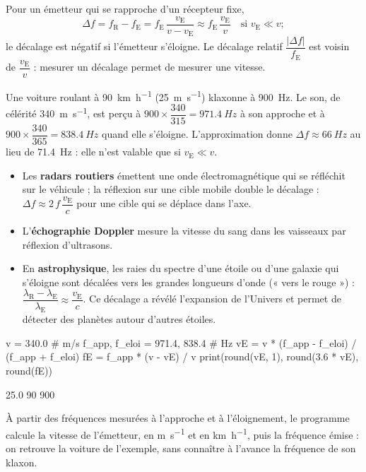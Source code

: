 \begin{loi}
Pour un émetteur qui se rapproche d'un récepteur fixe,
\[\Delta f=f_\mathrm{R}-f_\mathrm{E}=f_\mathrm{E}\,\frac{v_\mathrm{E}}{v-v_\mathrm{E}}\approx f_\mathrm{E}\,\frac{v_\mathrm{E}}{v}\quad\text{si }v_\mathrm{E}\ll v ;\]
le décalage est négatif si l'émetteur s'éloigne. Le décalage relatif $\dfrac{|\Delta f|}{f_\mathrm{E}}$ est voisin de $\dfrac{v_\mathrm{E}}{v}$ :
mesurer un décalage permet de mesurer une vitesse.
\end{loi}
\begin{exemple}
Une voiture roulant à \qty{90}{km.h^{-1}} (\qty{25}{m.s^{-1}}) klaxonne à \qty{900}{Hz}. Le son, de célérité \qty{340}{m.s^{-1}}, est
perçu à $900\times\dfrac{340}{315}=\qty{971,4}{Hz}$ à son approche et à $900\times\dfrac{340}{365}=\qty{838,4}{Hz}$ quand elle s'éloigne.
L'approximation donne $\Delta f\approx\qty{66}{Hz}$ au lieu de \qty{71,4}{Hz} : elle n'est valable que si $v_\mathrm{E}\ll v$.
\end{exemple}
\begin{propriete}[Applications]
\begin{itemize}
\item Les \textbf{radars routiers} émettent une onde électromagnétique qui se réfléchit sur le véhicule ; la réflexion
sur une cible mobile double le décalage : $\Delta f\approx2\,f\,\dfrac{v_\mathrm{E}}{c}$ pour une cible qui se déplace dans l'axe.
\item L'\textbf{échographie Doppler} mesure la vitesse du sang dans les vaisseaux par réflexion d'ultrasons.
\item En \textbf{astrophysique}, les raies du spectre d'une étoile ou d'une galaxie qui s'éloigne sont décalées vers les
grandes longueurs d'onde (« vers le rouge ») : $\dfrac{\lambda_\mathrm{R}-\lambda_\mathrm{E}}{\lambda_\mathrm{E}}\approx\dfrac{v_\mathrm{E}}{c}$. Ce décalage a
révélé l'expansion de l'Univers et permet de détecter des planètes autour d'autres étoiles.
\end{itemize}
\end{propriete}
\begin{codecote}[0.64]
\begin{pythoncol}
v = 340.0                         # m/s
f_app, f_eloi = 971.4, 838.4      # Hz
vE = v * (f_app - f_eloi) / (f_app + f_eloi)
fE = f_app * (v - vE) / v
print(round(vE, 1), round(3.6 * vE), round(fE))
\end{pythoncol}
\begin{consolecol}
25.0 90 900
\end{consolecol}
\cote
\fontsize{9.5}{12.5}\selectfont
{}\par\smallskip
À partir des fréquences mesurées à l'approche et à l'éloignement, le programme calcule la vitesse de l'émetteur, en
\unit{m.s^{-1}} et en \unit{km.h^{-1}}, puis la fréquence émise : on retrouve la voiture de l'exemple, sans connaître à
l'avance la fréquence de son klaxon.
\end{codecote}
